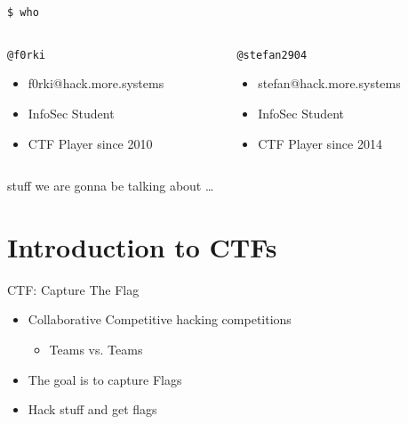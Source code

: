 \begin{frame}
  {\texttt{\$ who}}

  \begin{columns}
    \begin{column}{0.48\textwidth}
      {\texttt{@f0rki}}
      \begin{itemize}
        \item f0rki@hack.more.systems 
        \item InfoSec Student
        \item CTF Player since 2010
      \end{itemize}
    \end{column}

    \begin{column}{0.48\textwidth}
      \texttt{@stefan2904}
      \begin{itemize}
        \item stefan@hack.more.systems
        \item InfoSec Student
        \item CTF Player since 2014
      \end{itemize}
    \end{column}
  \end{columns}

\end{frame}


\begin{frame}{stuff we are gonna be talking about \ldots}
    \tableofcontents
\end{frame}


\section{Introduction to CTFs}

\begin{frame}[fragile]
  {CTF: Capture The Flag}

  \begin{itemize}
    \item Collaborative Competitive hacking competitions
    \begin{itemize}
    	\item Teams vs. Teams
    \end{itemize}
    \item The goal is to capture Flags
    \item Hack stuff and get flags
  \end{itemize}
\end{frame}



